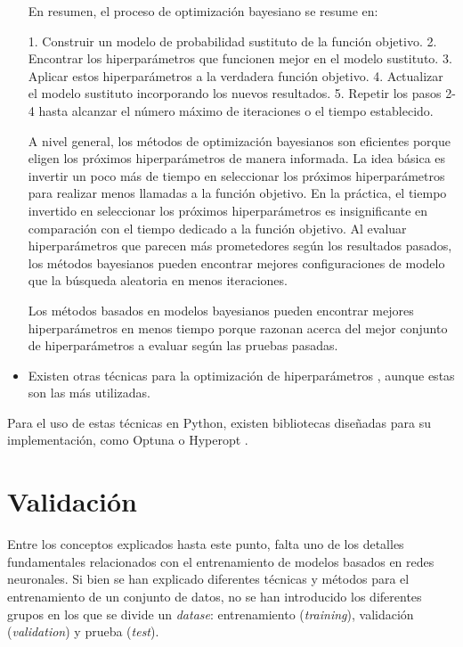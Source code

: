 \documentclass{report}
\begin{document}
\begin{itemize}
    En resumen, el proceso de optimización bayesiano se resume en:
    
    1. Construir un modelo de probabilidad sustituto de la función objetivo.
    2. Encontrar los hiperparámetros que funcionen mejor en el modelo sustituto.
    3. Aplicar estos hiperparámetros a la verdadera función objetivo.
    4. Actualizar el modelo sustituto incorporando los nuevos resultados.
    5. Repetir los pasos 2-4 hasta alcanzar el número máximo de iteraciones o el tiempo establecido.

    
    A nivel general, los métodos de optimización bayesianos son eficientes porque eligen los próximos hiperparámetros de manera informada. La idea básica es invertir un poco más de tiempo en seleccionar los próximos hiperparámetros para realizar menos llamadas a la función objetivo. En la práctica, el tiempo invertido en seleccionar los próximos hiperparámetros es insignificante en comparación con el tiempo dedicado a la función objetivo. Al evaluar hiperparámetros que parecen más prometedores según los resultados pasados, los métodos bayesianos pueden encontrar mejores configuraciones de modelo que la búsqueda aleatoria en menos iteraciones.
    
    Los métodos basados en modelos bayesianos pueden encontrar mejores hiperparámetros en menos tiempo porque razonan acerca del mejor conjunto de hiperparámetros a evaluar según las pruebas pasadas.

    \item Existen otras técnicas para la optimización de hiperparámetros \cite{PaperGrand} \cite{PaperHyper}, aunque estas son las más utilizadas.

\end{itemize}



Para el uso de estas técnicas en Python, existen bibliotecas diseñadas para su implementación, como Optuna o Hyperopt \cite{HPOPytorchLibrerias}.
















\newpage
\section{Validación}


Entre los conceptos explicados hasta este punto, falta uno de los detalles fundamentales relacionados con el entrenamiento de modelos basados en redes neuronales. Si bien se han explicado diferentes técnicas y métodos para el entrenamiento de un conjunto de datos, no se han introducido los diferentes grupos en los que se divide un \textit{datase}: entrenamiento (\textit{training}), validación (\textit{validation}) y prueba (\textit{test}).
\end{document}
